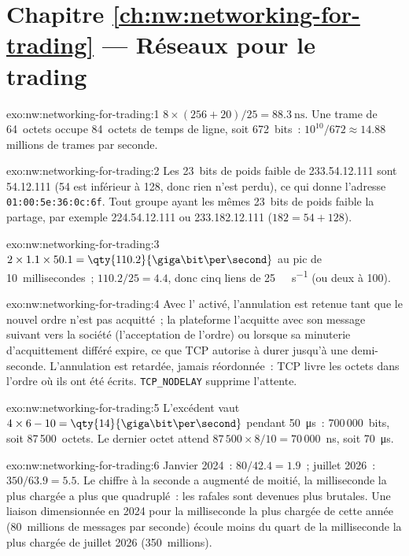 \section*{Chapitre \ref{ch:nw:networking-for-trading} --- Réseaux pour le trading}

\begin{solution}{exo:nw:networking-for-trading:1}
$8 \times (256 + 20) / 25 = \qty{88.3}{\nano\second}$. Une trame de 64~octets occupe 84~octets de temps de ligne, soit 672~bits~:
$10^{10}/672 \approx 14.88$ millions de trames par seconde.
\end{solution}

\begin{solution}{exo:nw:networking-for-trading:2}
Les 23~bits de poids faible de 233.54.12.111 sont 54.12.111 (54 est inférieur à 128, donc rien n'est perdu), ce qui donne l'adresse
\texttt{01:00:5e:36:0c:6f}. Tout groupe
ayant les mêmes 23~bits de poids faible la partage, par exemple 224.54.12.111 ou 233.182.12.111 ($182 = 54 + 128$).
\end{solution}

\begin{solution}{exo:nw:networking-for-trading:3}
$2 \times 1.1 \times 50.1 = \qty{110.2}{\giga\bit\per\second}$ au pic de 10~millisecondes~; $110.2/25 = 4.4$, donc cinq
liens de \qty{25}{\giga\bit\per\second} (ou deux à 100).
\end{solution}

\begin{solution}{exo:nw:networking-for-trading:4}
Avec l' activé, l'annulation est retenue tant que le nouvel ordre n'est pas acquitté~; la plateforme l'acquitte avec son message suivant
vers la société (l'acceptation de l'ordre) ou lorsque sa minuterie d'acquittement différé expire, ce que TCP autorise à durer jusqu'à
une demi-seconde. L'annulation est retardée, jamais réordonnée~: TCP livre les octets dans l'ordre où ils ont été écrits. \texttt{TCP\_NODELAY} supprime
l'attente.
\end{solution}

\begin{solution}{exo:nw:networking-for-trading:5}
L'excédent vaut $4 \times 6 - 10 = \qty{14}{\giga\bit\per\second}$ pendant \qty{50}{\micro\second}~: 700\,000~bits, soit 87\,500~octets. Le
dernier octet attend $87\,500 \times 8 / 10 = 70\,000$~ns, soit \qty{70}{\micro\second}.
\end{solution}

\begin{solution}{exo:nw:networking-for-trading:6}
Janvier 2024~: $80 / 42.4 = 1.9$~; juillet 2026~: $350 / 63.9 = 5.5$. Le chiffre à la seconde a augmenté de moitié, la milliseconde la plus chargée a plus que
quadruplé~: les rafales sont devenues plus brutales. Une liaison dimensionnée en 2024 pour la milliseconde la plus chargée de cette année (80~millions de messages par seconde)
écoule moins du quart de la milliseconde la plus chargée de juillet 2026 (350~millions).
\end{solution}

